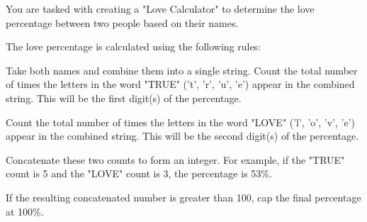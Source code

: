You are tasked with creating a "Love Calculator" to determine the love percentage between two people based on their names.

​The love percentage is calculated using the following rules:

​Take both names and combine them into a single string.
​Count the total number of times the letters in the word "TRUE" ('t', 'r', 'u', 'e') appear in the combined string. This will be the first digit(s) of the percentage.

​Count the total number of times the letters in the word "LOVE" ('l', 'o', 'v', 'e') appear in the combined string. This will be the second digit(s) of the percentage.

​Concatenate these two counts to form an integer. For example, if the "TRUE" count is 5 and the "LOVE" count is 3, the percentage is 53\%.

​If the resulting concatenated number is greater than 100, cap the final percentage at 100\%.

